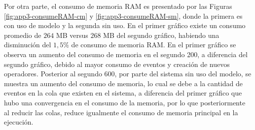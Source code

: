 Por otra parte, el consumo de memoria RAM es presentado por las Figuras \ref{fig:app3-consumeRAM-cm} y \ref{fig:app3-consumeRAM-sm}, donde la primera es con uso de modelo y la segunda sin uso. En el primer gr\'afico existe un consumo promedio de $264$ MB versus $268$ MB del segundo gr\'afico, habiendo una disminuci\'on del $1,5\%$ de consumo de memoria RAM. En el primer gr\'afico se observa un aumento del consumo de memoria en el segundo 200, a diferencia del segundo gr\'afico, debido al mayor consumo de eventos y creaci\'on de nuevos operadores. Posterior al segundo 600, por parte del sistema sin uso del modelo, se muestra un aumento del consumo de memoria, lo cual se debe a la cantidad de eventos en la cola que existen en el sistema, a diferencia del primer gr\'afico que hubo una convergencia en el consumo de la memoria, por lo que posteriormente al reducir las colas, reduce igualmente el consumo de memoria principal en la ejecuci\'on.

